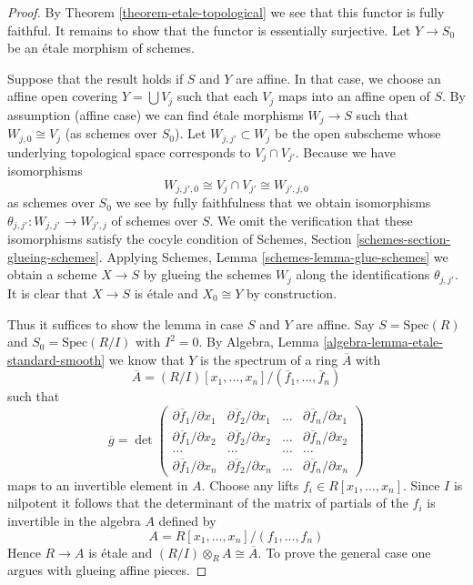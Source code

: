 \begin{proof}
By Theorem \ref{theorem-etale-topological}
we see that this functor is fully faithful.
It remains to show that the functor is essentially surjective.
Let $Y \to S_0$ be an \'etale morphism of schemes.

\medskip\noindent
Suppose that the result holds if $S$ and $Y$ are affine.
In that case, we choose an affine open covering
$Y = \bigcup V_j$ such that each $V_j$ maps
into an affine open of $S$. By assumption (affine case) we can
find \'etale morphisms $W_j \to S$ such that $W_{j, 0} \cong V_j$
(as schemes over $S_0$). Let $W_{j, j'} \subset W_j$
be the open subscheme whose underlying topological space
corresponds to $V_j \cap V_{j'}$. Because we have isomorphisms
$$
W_{j, j', 0} \cong V_j \cap V_{j'} \cong W_{j', j, 0}
$$
as schemes over $S_0$ we see by fully faithfulness that we
obtain isomorphisms
$\theta_{j, j'} : W_{j, j'} \to W_{j', j}$ of schemes over $S$.
We omit the verification that these isomorphisms satisfy the
cocyle condition of Schemes, Section \ref{schemes-section-glueing-schemes}.
Applying Schemes, Lemma \ref{schemes-lemma-glue-schemes}
we obtain a scheme $X \to S$ by
glueing the schemes $W_j$ along the identifications $\theta_{j, j'}$.
It is clear that $X \to S$ is \'etale and $X_0 \cong Y$ by construction.

\medskip\noindent
Thus it suffices to show the lemma in case $S$ and $Y$ are affine.
Say $S = \text{Spec}(R)$ and $S_0 = \text{Spec}(R/I)$ with $I^2 = 0$.
By Algebra, Lemma \ref{algebra-lemma-etale-standard-smooth} we know that
$Y$ is the spectrum of a ring $\overline{A}$ with
$$
\overline{A} = (R/I)[x_1, \ldots, x_n]/(\overline{f}_1, \ldots, \overline{f}_n)
$$
such that
$$
\overline{g} =
\det
\left(
\begin{matrix}
\partial \overline{f}_1/\partial x_1 &
\partial \overline{f}_2/\partial x_1 &
\ldots &
\partial \overline{f}_n/\partial x_1 \\
\partial \overline{f}_1/\partial x_2 &
\partial \overline{f}_2/\partial x_2 &
\ldots &
\partial \overline{f}_n/\partial x_2 \\
\ldots & \ldots & \ldots & \ldots \\
\partial \overline{f}_1/\partial x_n &
\partial \overline{f}_2/\partial x_n &
\ldots &
\partial \overline{f}_n/\partial x_n
\end{matrix}
\right)
$$
maps to an invertible element in $A$. Choose any lifts
$f_i \in R[x_1, \ldots, x_n]$. Since $I$ is nilpotent it
follows that the determinant of the matrix of partials of the
$f_i$ is invertible in the algebra $A$ defined by
$$
A = R[x_1, \ldots, x_n]/(f_1, \ldots, f_n)
$$
Hence $R \to A$ is \'etale and $(R/I) \otimes_R A \cong \overline{A}$.
To prove the general case one argues with glueing affine pieces.
\end{proof}

